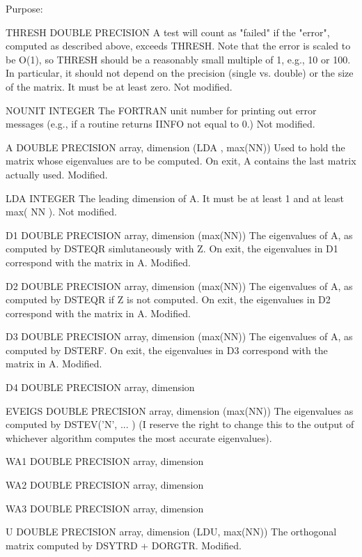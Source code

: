 \begin{DoxyParagraph}{Purpose\+: }
\begin{DoxyVerb}
  THRESH  DOUBLE PRECISION
          A test will count as "failed" if the "error", computed as
          described above, exceeds THRESH.  Note that the error
          is scaled to be O(1), so THRESH should be a reasonably
          small multiple of 1, e.g., 10 or 100.  In particular,
          it should not depend on the precision (single vs. double)
          or the size of the matrix.  It must be at least zero.
          Not modified.

  NOUNIT  INTEGER
          The FORTRAN unit number for printing out error messages
          (e.g., if a routine returns IINFO not equal to 0.)
          Not modified.

  A       DOUBLE PRECISION array, dimension (LDA , max(NN))
          Used to hold the matrix whose eigenvalues are to be
          computed.  On exit, A contains the last matrix actually
          used.
          Modified.

  LDA     INTEGER
          The leading dimension of A.  It must be at
          least 1 and at least max( NN ).
          Not modified.

  D1      DOUBLE PRECISION array, dimension (max(NN))
          The eigenvalues of A, as computed by DSTEQR simlutaneously
          with Z.  On exit, the eigenvalues in D1 correspond with the
          matrix in A.
          Modified.

  D2      DOUBLE PRECISION array, dimension (max(NN))
          The eigenvalues of A, as computed by DSTEQR if Z is not
          computed.  On exit, the eigenvalues in D2 correspond with
          the matrix in A.
          Modified.

  D3      DOUBLE PRECISION array, dimension (max(NN))
          The eigenvalues of A, as computed by DSTERF.  On exit, the
          eigenvalues in D3 correspond with the matrix in A.
          Modified.

  D4      DOUBLE PRECISION array, dimension

  EVEIGS  DOUBLE PRECISION array, dimension (max(NN))
          The eigenvalues as computed by DSTEV('N', ... )
          (I reserve the right to change this to the output of
          whichever algorithm computes the most accurate eigenvalues).

  WA1     DOUBLE PRECISION array, dimension

  WA2     DOUBLE PRECISION array, dimension

  WA3     DOUBLE PRECISION array, dimension

  U       DOUBLE PRECISION array, dimension (LDU, max(NN))
          The orthogonal matrix computed by DSYTRD + DORGTR.
          Modified.


\end{DoxyVerb}
\end{DoxyParagraph}
